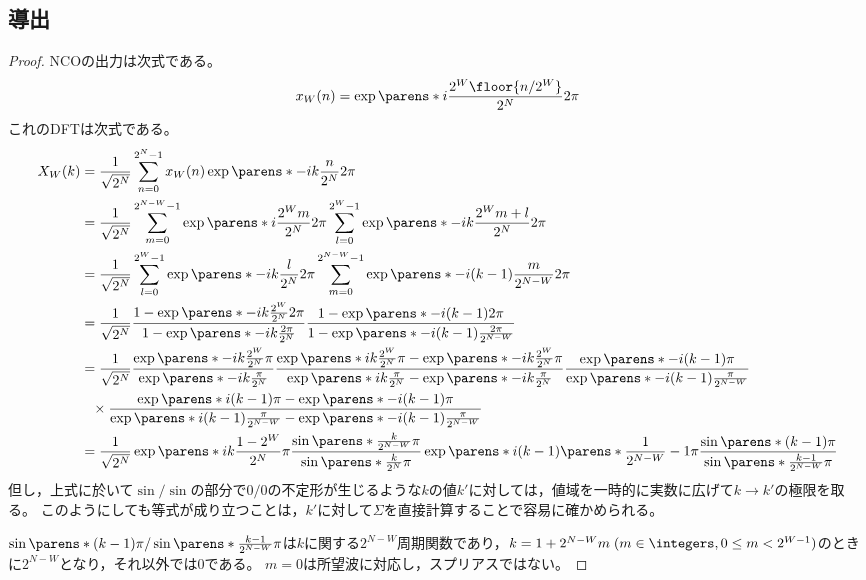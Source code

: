         \subsection{導出}
            \begin{proof}
                NCOの出力は次式である。
                \[ x_W(n) = \exp\parens*{i\frac{2^W\floor{n/2^W}}{2^N}2\pi} \]
                これのDFTは次式である。
                \begin{align*}
                    X_W(k) &= \frac{1}{\sqrt{2^N}} \sum_{n=0}^{2^N-1} x_W(n)\exp\parens*{-ik\frac{n}{2^N}2\pi} \\
                    &= \frac{1}{\sqrt{2^N}} \sum_{m=0}^{2^{N-W}-1} \exp\parens*{i\frac{2^W m}{2^N}2\pi} \sum_{l=0}^{2^W-1} \exp\parens*{-ik\frac{2^W m + l}{2^N}2\pi} \\
                    &= \frac{1}{\sqrt{2^N}} \sum_{l=0}^{2^W-1} \exp\parens*{-ik\frac{l}{2^N}2\pi} \sum_{m=0}^{2^{N-W}-1} \exp\parens*{-i(k-1)\frac{m}{2^{N-W}}2\pi} \\
                    &= \frac{1}{\sqrt{2^N}} \frac{1-\exp\parens*{-ik\frac{2^W}{2^N}2\pi}}{1-\exp\parens*{-ik\frac{2\pi}{2^N}}}\frac{1-\exp\parens*{-i(k-1)2\pi}}{1-\exp\parens*{-i(k-1)\frac{2\pi}{2^{N-W}}}} \\
                    &= \frac{1}{\sqrt{2^N}}\frac{\exp\parens*{-ik\frac{2^W}{2^N}\pi}}{\exp\parens*{-ik\frac{\pi}{2^N}}}\frac{\exp\parens*{ik\frac{2^W}{2^N}\pi} - \exp\parens*{-ik\frac{2^W}{2^N}\pi}}{\exp\parens*{ik\frac{\pi}{2^N}} - \exp\parens*{-ik\frac{\pi}{2^N}}}\frac{\exp\parens*{-i(k-1)\pi}}{\exp\parens*{-i(k-1)\frac{\pi}{2^{N-W}}}} \\
                    &\phantom{=}\times\frac{\exp\parens*{i(k-1)\pi} - \exp\parens*{-i(k-1)\pi}}{\exp\parens*{i(k-1)\frac{\pi}{2^{N-W}}} - \exp\parens*{-i(k-1)\frac{\pi}{2^{N-W}}}} \\
                    &= \frac{1}{\sqrt{2^N}} \exp\parens*{ik\frac{1-2^W}{2^N}\pi}\frac{\sin\parens*{\frac{k}{2^{N-W}}\pi}}{\sin\parens*{\frac{k}{2^N}\pi}}\exp\parens*{i(k-1)\parens*{\frac{1}{2^{N-W}}-1}\pi}\frac{\sin\parens*{(k-1)\pi}}{\sin\parens*{\frac{k-1}{2^{N-W}}\pi}} %
                \end{align*}
                但し，上式に於いて$\sin/\sin$の部分で$0/0$の不定形が生じるような$k$の値$k'$に対しては，値域を一時的に実数に広げて$k\to k'$の極限を取る。
                このようにしても等式が成り立つことは，$k'$に対して$\Sigma$を直接計算することで容易に確かめられる。
                \par
                $\sin\parens*{(k-1)\pi}/\sin\parens*{\frac{k-1}{2^{N-W}}\pi}$は$k$に関する$2^{N-W}$周期関数であり，$k = 1 + 2^{N-W}m\;(m\in\integers,0\leq m<2^{W-1})$のときに$2^{N-W}$となり，それ以外では0である。
                $m=0$は所望波に対応し，スプリアスではない。
            \end{proof}
